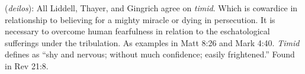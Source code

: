 \item[Timid,]

(\textit{deilos}):
All Liddell, Thayer, and Gingrich agree on \emph{timid}. Which is cowardice in relationship to believing for a mighty miracle or dying in persecution. It is necessary to overcome human fearfulness in relation to the eschatological sufferings under the tribulation. As examples in Matt 8:26 and Mark 4:40. \emph{Timid} defines as ``shy and nervous; without much confidence; easily frightened.''
Found in Rev 21:8.
